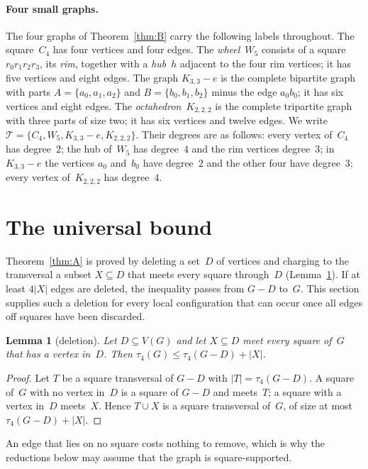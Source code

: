 \documentclass[11pt,letterpaper]{article}
\numberwithin{equation}{section}
\theoremstyle{plain}
\newtheorem{lemma}[theorem]{Lemma}
\theoremstyle{definition}
\theoremstyle{remark}
\newcommand{\Kme}{K_{3,3}-e}
\newcommand{\Oct}{K_{2,2,2}}
\newcommand{\Tfam}{\mathcal{T}}
\begin{document}
\paragraph{Four small graphs.} The four graphs of Theorem~\ref{thm:B} carry the following labels throughout. The square~$C_4$ has four vertices and four edges. The \emph{wheel}~$W_5$ consists of a square $r_0r_1r_2r_3$, its \emph{rim}, together with a \emph{hub}~$h$ adjacent to the four rim vertices; it has five vertices and eight edges. The graph $\Kme$ is the complete bipartite graph with parts $A=\{a_0,a_1,a_2\}$ and $B=\{b_0,b_1,b_2\}$ minus the edge $a_0b_0$; it has six vertices and eight edges. The \emph{octahedron}~$\Oct$ is the complete tripartite graph with three parts of size two; it has six vertices and twelve edges. We write $\Tfam=\{C_4,W_5,\Kme,\Oct\}$. Their degrees are as follows: every vertex of~$C_4$ has degree~$2$; the hub of~$W_5$ has degree~$4$ and the rim vertices degree~$3$; in~$\Kme$ the vertices $a_0$ and~$b_0$ have degree~$2$ and the other four have degree~$3$; every vertex of~$\Oct$ has degree~$4$.

\section{The universal bound}\label{sec:A}

Theorem~\ref{thm:A} is proved by deleting a set~$D$ of vertices and charging to the transversal a subset $X\subseteq D$ that meets every square through~$D$ (Lemma~\ref{lem:deletion}). If at least $4|X|$ edges are deleted, the inequality passes from $G-D$ to~$G$. This section supplies such a deletion for every local configuration that can occur once all edges off squares have been discarded.

\begin{lemma}[deletion]\label{lem:deletion}
Let $D\subseteq V(G)$ and let $X\subseteq D$ meet every square of~$G$ that has a vertex in~$D$. Then $\tau_4(G)\le\tau_4(G-D)+|X|$.
\end{lemma}

\begin{proof}
Let $T$ be a square transversal of $G-D$ with $|T|=\tau_4(G-D)$. A square of~$G$ with no vertex in~$D$ is a square of $G-D$ and meets~$T$; a square with a vertex in~$D$ meets~$X$. Hence $T\cup X$ is a square transversal of~$G$, of size at most $\tau_4(G-D)+|X|$.
\end{proof}

An edge that lies on no square costs nothing to remove, which is why the reductions below may assume that the graph is square-supported.
\end{document}
